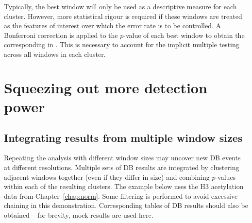 \documentclass{report}\usepackage[]{graphicx}\usepackage[usenames,dvipsnames]{color}
\newcommand{\hlstr}[1]{\textcolor[rgb]{0.251,0.627,0.251}{#1}}%
\newcommand{\hlopt}[1]{\textcolor[rgb]{0,0,0}{#1}}%
\newcommand{\hlstd}[1]{\textcolor[rgb]{0.251,0.251,0.251}{#1}}%
\newcommand{\hlkwb}[1]{\textcolor[rgb]{0,0,0}{#1}}%
\newcommand{\hlkwd}[1]{\textcolor[rgb]{0.878,0.439,0.125}{#1}}%
\newenvironment{knitrout}{}{} %
\begin{document}
\begin{knitrout}
\color{fgcolor}
\end{knitrout}

Typically, the best window will only be used as a descriptive measure for each cluster.
However, more statistical rigour is required if these windows are treated as the features of interest over which the error rate is to be controlled.
A Bonferroni correction is applied to the $p$-value of each best window to obtain the corresponding  in .
This is necessary to account for the implicit multiple testing across all windows in each cluster.

\section{Squeezing out more detection power}

\subsection{Integrating results from multiple window sizes}
\label{sec:bin_integrate}
Repeating the analysis with different window sizes may uncover new DB events at different resolutions.
Multiple sets of DB results are integrated by clustering adjacent windows together (even if they differ in size) and combining $p$-values within each of the resulting clusters.
The example below uses the H3 acetylation data from Chapter~\ref{chap:norm}.
Some filtering is performed to avoid excessive chaining in this demonstration.
Corresponding tables of DB results should also be obtained -- for brevity, mock results are used here.
\end{document}
